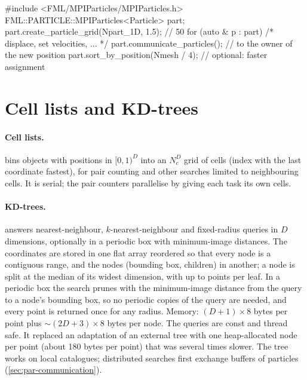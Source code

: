 \begin{cppcode}
#include <FML/MPIParticles/MPIParticles.h>
FML::PARTICLE::MPIParticles<Particle> part;
part.create_particle_grid(Npart_1D, 1.5);          // 50%
for (auto & p : part) { /* displace, set velocities, ... */ }
part.communicate_particles();                      // to the owner of the new position
part.sort_by_position(Nmesh / 4);                  // optional: faster assignment
\end{cppcode}

\section{Cell lists and KD-trees}\label{sec:part-search}

\paragraph*{Cell lists.}  bins objects with positions in $[0,1)^D$ into an $N_c^D$ grid of cells (index
with the last coordinate fastest), for pair counting and other searches limited to neighbouring cells. It is serial; the pair
counters parallelise by giving each task its own cells.

\paragraph*{KD-trees.}  \cite{Bentley1975} answers nearest-neighbour, $k$-nearest-neighbour and fixed-radius queries in
$D$ dimensions, optionally in a periodic box with minimum-image distances. The coordinates are stored in one flat array reordered so
that every node is a contiguous range, and the nodes (bounding box, children) in another; a node is split at the median of its widest
dimension, with up to  points per leaf. In a periodic box the search prunes with the minimum-image distance from the
query to a node's bounding box, so no periodic copies of the query are needed, and every point is returned once for any radius.
Memory: $(D+1)\times8$ bytes per point plus $\sim(2D+3)\times8$ bytes per node. The queries are const and thread safe. It replaced an
adaptation of an external tree with one heap-allocated node per point (about 180 bytes per point) that was several times slower. The
tree works on local catalogues; distributed searches first exchange buffers of particles (\cref{sec:par-communication}).

